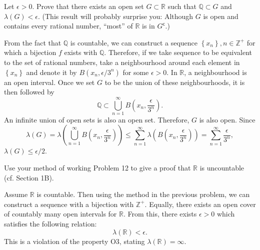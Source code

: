 \documentclass[answers]{exam}
\begin{document}
\begin{questions}
   \question
   Let $\epsilon > 0$. Prove that there exists an open set $G \subset \mathbb{R}$ such that $\mathbb{Q} \subset G$ and $\lambda\left(G\right) < \epsilon$. (This result will probably surprise you: Although $G$ is open and contains every rational number, ``most'' of $\mathbb{R}$ is in $G^{\mathsf{c}}$.)
   \begin{solution}
      From the fact that $\mathbb{Q}$ is countable, we can construct a sequence $\left\{x_{n} \right\}, n \in \mathbb{Z}^{+}$ for which a bijection $f$ exists with $\mathbb{Q}$. Therefore, if we take sequence to be equivalent to the set of rational numbers, take a neighbourhood around each element in $\left\{x_{n} \right\}$ and denote it by $B\left(x_{n}, \epsilon/3^{n}\right)$ for some $\epsilon>0$. In $\mathbb{R}$, a neighbourhood is an open interval. Once we set $G$ to be the union of these neighbourhoods, it is then followed by
      $$
         \mathbb{Q} \subset \bigcup_{n=1}^{\infty}B\left(x_{n}, \frac{\epsilon}{3^{n}}\right).
      $$
      An infinite union of open sets is also an open set. Therefore, $G$ is also open. Since
      $$
         \lambda\left(G\right) = \lambda\left(\bigcup_{n=1}^{\infty} B\left(x_{n}, \frac{\epsilon}{3^{n}}\right) \right) \leq \sum_{n=1}^{\infty}\lambda\left(B\left(x_{n}, \frac{\epsilon}{3^{n}}\right)\right) = \sum_{n=1}^{\infty} \frac{\epsilon}{3^{n}},
      $$
      $\lambda\left(G\right) \leq \epsilon/2$.
   \end{solution}
   \question
   Use your method of working Problem 12 to give a proof that $\mathbb{R}$ is uncountable (cf. Section 1B).
   \begin{solution}
      Assume $\mathbb{R}$ is countable. Then using the method in the previous problem, we can construct a sequence with a bijection with $\mathbb{Z}^{+}$. Equally, there exists an open cover of countably many open intervals for $\mathbb{R}$. From this, there exists $\epsilon > 0$ which satisfies the following relation:
      $$
         \lambda\left(\mathbb{R}\right) < \epsilon.
      $$
      This is a violation of the property O3, stating $\lambda\left(\mathbb{R}\right)=\infty$.
   \end{solution}
\end{questions}
\end{document}
